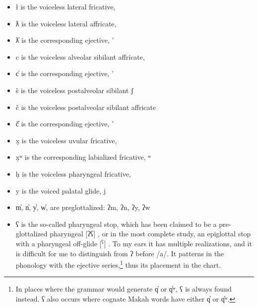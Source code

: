 \begin{itemize}
	\item ł is the voiceless lateral fricative, \textbeltl
	\item ƛ is the voiceless lateral affricate, 
	\item ƛ̓ is the corresponding ejective, '
	\item c is the voiceless alveolar sibilant affricate, 
	\item c̓ is the corresponding ejective, '
	\item š is the voiceless postalveolar sibilant ʃ
	\item č is the voiceless postalveolar sibilant affricate 
	\item č̓ is the corresponding ejective, '
	\item x̣ is the voiceless uvular fricative, \textchi
	\item x̣ʷ is the corresponding labialized fricative, {\textchi}ʷ
	\item ḥ is the voiceless pharyngeal fricative, {\textcrh}
	\item y is the voiced palatal glide, j
	\item m̓, n̓, y̓, w̓, are preglottalized: ʔm, ʔn, ʔy, ʔw
	\item ʕ is the so-called pharyngeal stop, which has been claimed to be a pre-glottalized pharyngeal [ʔʕ] \citep{shank2000}, or in the most complete study, an epiglottal stop with a pharyngeal off-glide [\textbarglotstop$^{\text{ʕ}}$] \citep{esling2005}. To my ears it has multiple realizations, and it is difficult for me to distinguish from ʔ before /a/. It patterns in the phonology with the ejective series,\footnote{In places where the grammar would generate q̓ or q̓ʷ, ʕ is always found instead. ʕ also occurs where cognate Makah words have either q̓ or q̓ʷ.} thus its placement in the chart.
\end{itemize}